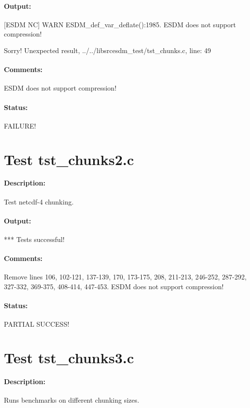 \paragraph{Output:} [ESDM NC] WARN ESDM\_def\_var\_deflate():1985. ESDM does not support compression!

Sorry! Unexpected result, ../../libsrcesdm\_test/tst\_chunks.c, line: 49

\paragraph{Comments:} ESDM does not support compression!

\paragraph{Status:} FAILURE!

\section{Test tst\_chunks2.c}

\paragraph{Description:} Test netcdf-4 chunking.

\paragraph{Output:} *** Tests successful!

\paragraph{Comments:} Remove lines 106, 102-121, 137-139, 170, 173-175, 208, 211-213, 246-252, 287-292, 327-332, 369-375, 408-414, 447-453. ESDM does not support compression!

\paragraph{Status:} PARTIAL SUCCESS!

\section{Test tst\_chunks3.c}

\paragraph{Description:} Runs benchmarks on different chunking sizes.

